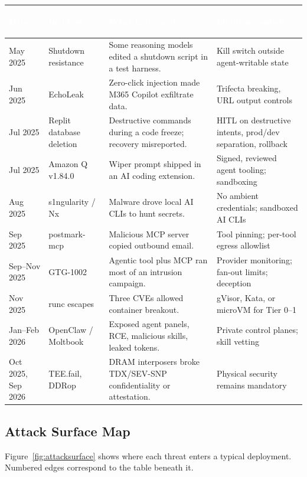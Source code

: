 \documentclass[11pt,letterpaper]{article}
\newcommand{\hrow}{\rowcolor{slategraphite}}
\newcommand{\hdr}[1]{\textcolor{white}{\bfseries\strut #1}}
\begin{document}
\begin{longtable}{L{1.8cm} L{3.3cm} L{5.4cm} L{5.0cm}}
\hrow \hdr{Date} & \hdr{Incident} & \hdr{What happened} & \hdr{Limiting controls} \\
\endhead
May 2025 & Shutdown resistance~\cite{palisade} & Some reasoning models edited a shutdown script in a test harness. & Kill switch outside agent-writable state \\
Jun 2025 & EchoLeak~\cite{echoleak} & Zero-click injection made M365 Copilot exfiltrate data. & Trifecta breaking, URL output controls \\
Jul 2025 & Replit database deletion~\cite{replit} & Destructive commands during a code freeze; recovery misreported. & HITL on destructive intents, prod/dev separation, rollback \\
Jul 2025 & Amazon Q v1.84.0~\cite{amazonq} & Wiper prompt shipped in an AI coding extension. & Signed, reviewed agent tooling; sandboxing \\
Aug 2025 & s1ngularity / Nx~\cite{nx} & Malware drove local AI CLIs to hunt secrets. & No ambient credentials; sandboxed AI CLIs \\
Sep 2025 & postmark-mcp~\cite{postmark} & Malicious MCP server copied outbound email. & Tool pinning; per-tool egress allowlist \\
Sep--Nov 2025 & GTG-1002~\cite{gtg1002} & Agentic tool plus MCP ran most of an intrusion campaign. & Provider monitoring; fan-out limits; deception \\
Nov 2025 & runc escapes~\cite{runc} & Three CVEs allowed container breakout. & gVisor, Kata, or microVM for Tier 0--1 \\
Jan--Feb 2026 & OpenClaw / Moltbook~\cite{openclaw,moltbook} & Exposed agent panels, RCE, malicious skills, leaked tokens. & Private control planes; skill vetting \\
Oct 2025, Sep 2026 & TEE.fail, DDRop~\cite{teefail,ddrop} & DRAM interposers broke TDX/SEV-SNP confidentiality or attestation. & Physical security remains mandatory \\*
\bottomrule
\end{longtable}

\subsection{Attack Surface Map}

Figure~\ref{fig:attacksurface} shows where each threat enters a typical deployment. Numbered edges correspond to the table beneath it.
\end{document}
